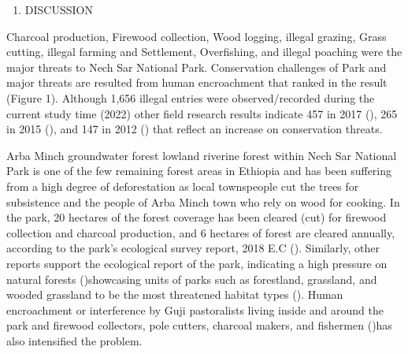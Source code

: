 \documentclass[
  letterpaper,
  DIV=11,
  numbers=noendperiod]{scrartcl}
\providecommand{\tightlist}{%
  \setlength{\itemsep}{0pt}\setlength{\parskip}{0pt}}\usepackage{longtable,booktabs,array}
\begin{document}
\begin{enumerate}
\def\labelenumi{\arabic{enumi}.}
\setcounter{enumi}{4}
\tightlist
\item
  DISCUSSION
\end{enumerate}

Charcoal production, Firewood collection, Wood logging, illegal grazing,
Grass cutting, illegal farming and Settlement, Overfishing, and illegal
poaching were the major threats to Nech Sar National Park. Conservation
challenges of Park and major threats are resulted from human
encroachment that ranked in the result (Figure 1). Although 1,656
illegal entries were observed/recorded during the current study time
(2022) other field research results indicate 457 in 2017
(), 265 in 2015
(), and 147 in 2012
() that
reflect an increase on conservation threats.

Arba Minch groundwater forest lowland riverine forest within Nech Sar
National Park is one of the few remaining forest areas in Ethiopia and
has been suffering from a high degree of deforestation as local
townspeople cut the trees for subsistence and the people of Arba Minch
town who rely on wood for cooking. In the park, 20 hectares of the
forest coverage has been cleared (cut) for firewood collection and
charcoal production, and 6 hectares of forest are cleared annually,
according to the park's ecological survey report, 2018 E.C
(). Similarly, other reports support
the ecological report of the park, indicating a high pressure on natural
forests ()showcasing
units of parks such as forestland, grassland, and wooded grassland to be
the most threatened habitat types (). Human encroachment or interference by Guji pastoralists
living inside and around the park and firewood collectors, pole cutters,
charcoal makers, and fishermen ()has also intensified the problem.
\end{document}
